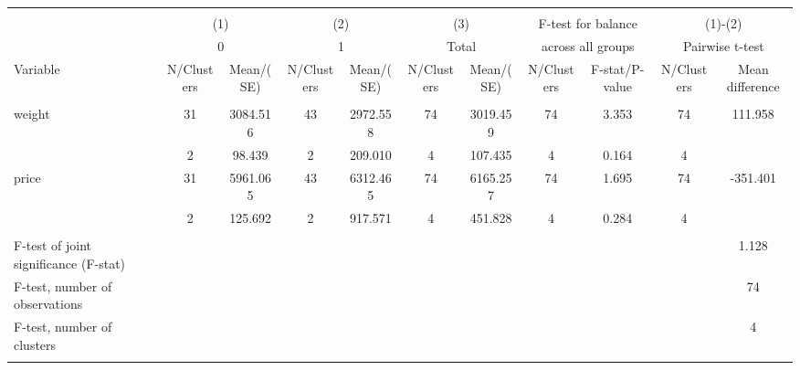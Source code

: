 \begin{tabular}{@{\extracolsep{5pt}}lcccccccccc}
\\[-1.8ex]\hline \hline \\[-1.8ex]
 & \multicolumn{2}{c}{(1)}  & \multicolumn{2}{c}{(2)}  & \multicolumn{2}{c}{(3)}  & \multicolumn{2}{c}{F-test for balance} & \multicolumn{2}{c}{(1)-(2)} \\
 & \multicolumn{2}{c}{0}  & \multicolumn{2}{c}{1}  & \multicolumn{2}{c}{Total}  & \multicolumn{2}{c}{across all groups} & \multicolumn{2}{c}{Pairwise t-test}  \\
Variable & N/Clusters & Mean/(SE) & N/Clusters & Mean/(SE) & N/Clusters & Mean/(SE) & N/Clusters & F-stat/P-value & N/Clusters & Mean difference \\ \hline \\[-1.8ex] 
weight   & 31    &  3084.516    & 43    &  2972.558    & 74    &  3019.459    & 74    &     3.353    & 74    &   111.958   \\
 & 2  &    98.439  & 2  &   209.010  & 4  &   107.435  & 4  &     0.164  & 4  &   \\
price   & 31    &  5961.065    & 43    &  6312.465    & 74    &  6165.257    & 74    &     1.695    & 74    &  -351.401   \\
 & 2  &   125.692  & 2  &   917.571  & 4  &   451.828  & 4  &     0.284  & 4  &   \\
\hline \\[-1.8ex]
F-test of joint significance (F-stat) & &   & &   & &   & &     & &      1.128   \\
F-test, number of observations & &   & &   & &   & &   & &  74   \\
F-test, number of clusters & &   & &   & &   & &     & &  4   \\
\hline \\[-1.8ex]

\end{tabular}
